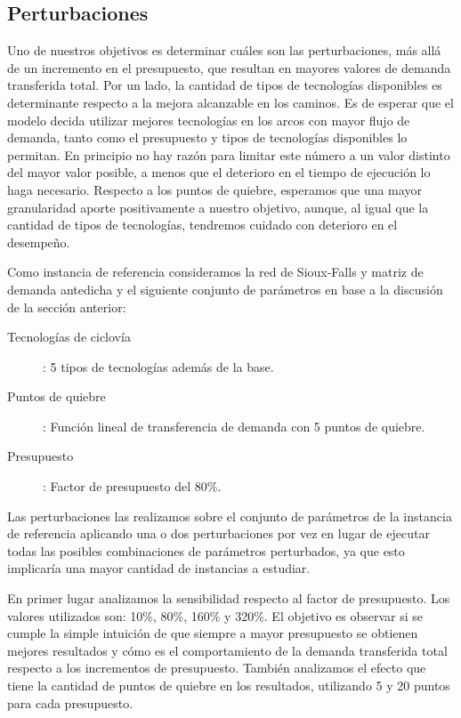 \FloatBarrier
\subsection{Perturbaciones}

Uno de nuestros objetivos es determinar cuáles son las perturbaciones, más allá de un incremento en el presupuesto, que resultan en mayores valores de demanda transferida total. Por un lado, la cantidad de tipos de tecnologías disponibles es determinante respecto a la mejora alcanzable en los caminos. Es de esperar que el modelo decida utilizar mejores tecnologías en los arcos con mayor flujo de demanda, tanto como el presupuesto y tipos de tecnologías disponibles lo permitan. En principio no hay razón para limitar este número a un valor distinto del mayor valor posible, a menos que el deterioro en el tiempo de ejecución lo haga necesario. Respecto a los puntos de quiebre, esperamos que una mayor granularidad aporte positivamente a nuestro objetivo, aunque, al igual que la cantidad de tipos de tecnologías, tendremos cuidado con deterioro en el desempeño.

Como instancia de referencia consideramos la red de Sioux-Falls y matriz de demanda antedicha y el siguiente conjunto de parámetros en base a la discusión de la sección anterior:

\begin{description}
  \item[Tecnologías de ciclovía]: 5 tipos de tecnologías además de la base.
  \item[Puntos de quiebre]: Función lineal de transferencia de demanda con 5 puntos de quiebre.
  \item[Presupuesto]: Factor de presupuesto del 80\%.
\end{description}

Las perturbaciones las realizamos sobre el conjunto de parámetros de la instancia de referencia aplicando una o dos perturbaciones por vez en lugar de ejecutar todas las posibles combinaciones de parámetros perturbados, ya que esto implicaría una mayor cantidad de instancias a estudiar.

En primer lugar analizamos la sensibilidad respecto al factor de presupuesto. Los valores utilizados son: 10\%, 80\%, 160\% y 320\%. El objetivo es observar si se cumple la simple intuición de que siempre a mayor presupuesto se obtienen mejores resultados y cómo es el comportamiento de la demanda transferida total respecto a los incrementos de presupuesto. También analizamos el efecto que tiene la cantidad de puntos de quiebre en los resultados, utilizando 5 y 20 puntos para cada presupuesto.

